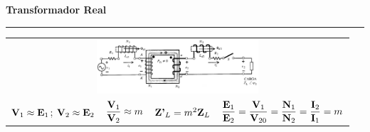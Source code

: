 \documentclass[11pt,a4paper]{article}
\newcommand{\fasor}[1]{\uppercase{\textbf{#1}}}
\newcommand{\subtitulo}[1]{
    \textbf{#1} \\ \vspace{.1cm} {\color{gray} \hrule}
}
\begin{document}
\begin{cajita}
        \begin{center}
            \subtitulo{Transformador Real}
        \end{center}
        \begin{tabular}{r |c | c | l}
            \multicolumn{4}{c}{\includegraphics[width = 6cm]{trafo-real}} \\
            $\fasor{V}_{1}\approx\fasor{E}_{1}$; $\fasor{V}_{2}\approx\fasor{E}_{2}$ &
            $\dfrac{\fasor{V}_{1}}{\fasor{V}_{2}}\approx m$ &
            $\fasor{Z'}_{L}= m^{2} \fasor{Z}_{L}$&
            $\dfrac{\fasor{E}_{1}}{\fasor{E}_{2}}=\dfrac{\fasor{V}_{1}}{\fasor{V}_{20}}=\dfrac{\fasor{N}_{1}}{\fasor{N}_{2}}=\dfrac{\fasor{I}_{2}}{\fasor{I}_{1}}=m$\\
        \end{tabular}

    \end{cajita}
\newpage
\end{document}
